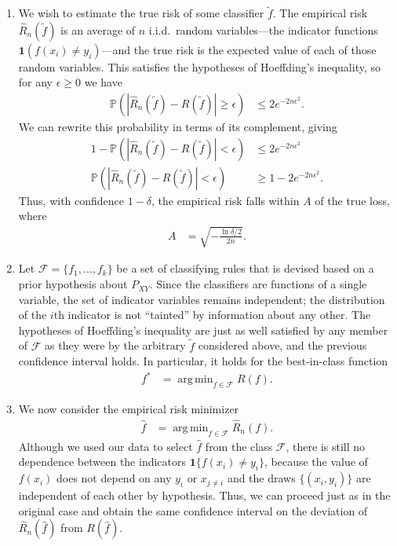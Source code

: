 \documentclass[11pt,letterpaper]{article}
\DeclareMathOperator*{\argmin}{arg\,min}
\newcommand{\e}{\epsilon}
\numberwithin{equation}{section}
\numberwithin{figure}{section}
\begin{document}
\begin{enumerate}
	\begin{enumerate}
		\item We wish to estimate the true risk of some classifier $\tilde{f}$. The empirical risk $\hat{R}_n(\tilde{f})$ is an average of $n$ i.i.d.\ random variables---the indicator functions $\bm{1}(f(x_i) \neq y_i)$---and the true risk is the expected value of each of those random variables. This satisfies the hypotheses of Hoeffding's inequality, so for any $\e \geq 0$ we have
		\begin{align*}
			\mathbb{P}\left(\left|\hat{R}_n(\tilde{f}) - R(\tilde{f})\right| \geq \e\right) &\leq 2 e^{-2n\e^2}.
		\end{align*}
		We can rewrite this probability in terms of its complement, giving
		\begin{align*}
			1 - \mathbb{P}\left(\left|\hat{R}_n(\tilde{f}) - R(\tilde{f})\right| < \e\right) &\leq 2e^{-2n\e^2}\\
			\mathbb{P}\left(\left|\hat{R}_n(\tilde{f}) - R(\tilde{f})\right| < \e\right) &\geq 1 - 2e^{-2n\e^2}.
		\end{align*}
		Thus, with confidence $1-\delta$, the empirical risk falls within $A$ of the true loss, where
		\begin{align*}
			A &= \sqrt{-\frac{\ln \delta/2}{2n}}.
		\end{align*}






		\item Let $\mathcal{F} = \{f_1,\ldots,f_k\}$ be a set of classifying rules that is devised based on a prior hypothesis about $P_{XY}$. Since the classifiers are functions of a single variable, the set of indicator variables remains independent; the distribution of the $i$th indicator is not ``tainted'' by information about any other. The hypotheses of Hoeffding's inequality are just as well satisfied by any member of $\mathcal{F}$ as they were by the arbitrary $\tilde{f}$ considered above, and the previous confidence interval holds. In particular, it holds for the best-in-class function
		\begin{align*}
			f^\ast &= \argmin_{f \in \mathcal{F}} R(f).
		\end{align*}





		\item We now consider the empirical risk minimizer
		\begin{align*}
			\hat{f} &= \argmin_{f \in \mathcal{F}} \hat{R}_n(f).
		\end{align*}
		Although we used our data to select $\hat{f}$ from the class $\mathcal{F}$, there is still no dependence between the indicators $\bm{1}\{f(x_i)\neq y_i\}$, because the value of $f(x_i)$ does not depend on any $y_i$ or $x_{j\neq i}$ and the draws $\{(x_i,y_i)\}$ are independent of each other by hypothesis. Thus, we can proceed just as in the original case and obtain the same confidence interval on the deviation of $\hat{R}_n(\hat{f})$ from $R(\hat{f})$.





\end{enumerate}
\end{enumerate}
\end{document}
